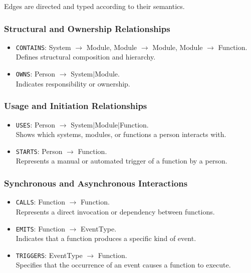 Edges are directed and typed according to their semantics.

\subsubsection{Structural and Ownership Relationships}
\begin{itemize}
    \item \texttt{CONTAINS}: System $\rightarrow$ Module, Module $\rightarrow$ Module, Module $\rightarrow$ Function.\\
    Defines structural composition and hierarchy.
    \item \texttt{OWNS}: Person $\rightarrow$ System$|$Module.\\
    Indicates responsibility or ownership.
\end{itemize}

\subsubsection{Usage and Initiation Relationships}
\begin{itemize}
    \item \texttt{USES}: Person $\rightarrow$ System$|$Module$|$Function.\\
    Shows which systems, modules, or functions a person interacts with.
    \item \texttt{STARTS}: Person $\rightarrow$ Function.\\
    Represents a manual or automated trigger of a function by a person.
\end{itemize}

\subsubsection{Synchronous and Asynchronous Interactions}
\begin{itemize}
    \item \texttt{CALLS}: Function $\rightarrow$ Function.\\
    Represents a direct invocation or dependency between functions.
    \item \texttt{EMITS}: Function $\rightarrow$ EventType.\\
    Indicates that a function produces a specific kind of event.
    \item \texttt{TRIGGERS}: EventType $\rightarrow$ Function.\\
    Specifies that the occurrence of an event causes a function to execute.
\end{itemize}

